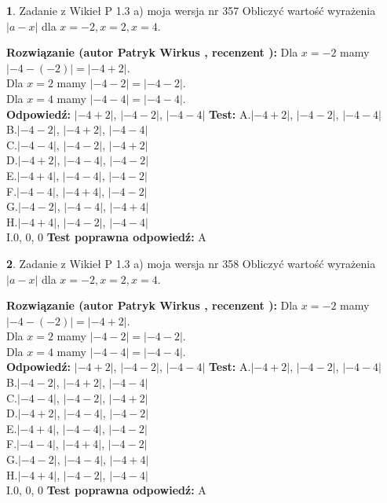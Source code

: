 \documentclass[12pt, a4paper]{article}
\theoremstyle{definition} %
\newtheorem{zad}{}
\newcommand{\zadStart}[1]{\begin{zad}#1\newline}
\newcommand{\zadStop}{\end{zad}}
\newcommand{\rozwStart}[2]{\noindent \textbf{Rozwiązanie (autor #1 , recenzent #2): }\newline}
\newcommand{\rozwStop}{\newline}
\newcommand{\odpStart}{\noindent \textbf{Odpowiedź:}\newline}
\newcommand{\odpStop}{\newline}
\newcommand{\testStart}{\noindent \textbf{Test:}\newline}
\newcommand{\testStop}{\newline}
\newcommand{\kluczStart}{\noindent \textbf{Test poprawna odpowiedź:}\newline}
\newcommand{\kluczStop}{\newline}
\begin{document}
\zadStart{Zadanie z Wikieł P 1.3 a) moja wersja nr 357}
Obliczyć wartość wyrażenia $|a - x|$ dla $x=-2,x=2,x=4$.
\zadStop
\rozwStart{Patryk Wirkus}{}
Dla $x = -2$ mamy $|-4 - (-2)| = |-4 + 2|$.\\
Dla $x = 2$ mamy $|-4 - 2| = |-4 - 2|$.\\
Dla $x = 4$ mamy $|-4 - 4| = |-4 - 4|$.\\
\rozwStop
\odpStart
$|-4 + 2|$, $|-4 - 2|$, $|-4 - 4|$
\odpStop
\testStart
A.$|-4 + 2|$, $|-4 - 2|$, $|-4 - 4|$\\
B.$|-4 - 2|$, $|-4 + 2|$, $|-4 - 4|$\\
C.$|-4 - 4|$, $|-4 - 2|$, $|-4 + 2|$\\
D.$|-4 + 2|$, $|-4 - 4|$, $|-4 - 2|$\\
E.$|-4 + 4|$, $|-4 - 4|$, $|-4 - 2|$\\
F.$|-4 - 4|$, $|-4 + 4|$, $|-4 - 2|$\\
G.$|-4 - 2|$, $|-4 - 4|$, $|-4 + 4|$\\
H.$|-4 + 4|$, $|-4 - 2|$, $|-4 - 4|$\\
I.$0$, $0$, $0$
\testStop
\kluczStart
A
\kluczStop



\zadStart{Zadanie z Wikieł P 1.3 a) moja wersja nr 358}
Obliczyć wartość wyrażenia $|a - x|$ dla $x=-2,x=2,x=4$.
\zadStop
\rozwStart{Patryk Wirkus}{}
Dla $x = -2$ mamy $|-4 - (-2)| = |-4 + 2|$.\\
Dla $x = 2$ mamy $|-4 - 2| = |-4 - 2|$.\\
Dla $x = 4$ mamy $|-4 - 4| = |-4 - 4|$.\\
\rozwStop
\odpStart
$|-4 + 2|$, $|-4 - 2|$, $|-4 - 4|$
\odpStop
\testStart
A.$|-4 + 2|$, $|-4 - 2|$, $|-4 - 4|$\\
B.$|-4 - 2|$, $|-4 + 2|$, $|-4 - 4|$\\
C.$|-4 - 4|$, $|-4 - 2|$, $|-4 + 2|$\\
D.$|-4 + 2|$, $|-4 - 4|$, $|-4 - 2|$\\
E.$|-4 + 4|$, $|-4 - 4|$, $|-4 - 2|$\\
F.$|-4 - 4|$, $|-4 + 4|$, $|-4 - 2|$\\
G.$|-4 - 2|$, $|-4 - 4|$, $|-4 + 4|$\\
H.$|-4 + 4|$, $|-4 - 2|$, $|-4 - 4|$\\
I.$0$, $0$, $0$
\testStop
\kluczStart
A
\kluczStop
\end{document}
